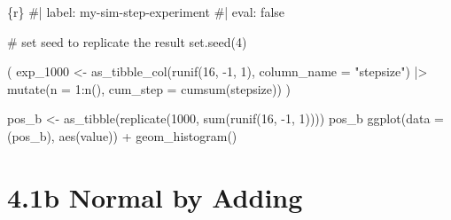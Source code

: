 \documentclass[
  letterpaper,
  DIV=11,
  numbers=noendperiod]{scrreprt}
\newenvironment{Shaded}{\begin{snugshade}}{\end{snugshade}}
\newcommand{\AttributeTok}[1]{\textcolor[rgb]{0.40,0.45,0.13}{#1}}
\newcommand{\CommentTok}[1]{\textcolor[rgb]{0.37,0.37,0.37}{#1}}
\newcommand{\DecValTok}[1]{\textcolor[rgb]{0.68,0.00,0.00}{#1}}
\newcommand{\FunctionTok}[1]{\textcolor[rgb]{0.28,0.35,0.67}{#1}}
\newcommand{\InformationTok}[1]{\textcolor[rgb]{0.37,0.37,0.37}{#1}}
\newcommand{\NormalTok}[1]{\textcolor[rgb]{0.00,0.23,0.31}{#1}}
\newcommand{\OtherTok}[1]{\textcolor[rgb]{0.00,0.23,0.31}{#1}}
\newcommand{\SpecialCharTok}[1]{\textcolor[rgb]{0.37,0.37,0.37}{#1}}
\newcommand{\StringTok}[1]{\textcolor[rgb]{0.13,0.47,0.30}{#1}}
\begin{document}
\begin{Shaded}
\begin{Highlighting}[]
\InformationTok{\textasciigrave{}\textasciigrave{}\textasciigrave{}\{r\}}
\CommentTok{\#| label: my{-}sim{-}step{-}experiment}
\CommentTok{\#| eval: false}

\CommentTok{\# set seed to replicate the result}
\FunctionTok{set.seed}\NormalTok{(}\DecValTok{4}\NormalTok{)}

\NormalTok{(}
\NormalTok{    exp\_1000 }\OtherTok{\textless{}{-}} \FunctionTok{as\_tibble\_col}\NormalTok{(}\FunctionTok{runif}\NormalTok{(}\DecValTok{16}\NormalTok{, }\SpecialCharTok{{-}}\DecValTok{1}\NormalTok{, }\DecValTok{1}\NormalTok{), }\AttributeTok{column\_name =} \StringTok{"stepsize"}\NormalTok{) }\SpecialCharTok{|\textgreater{}} 
        \FunctionTok{mutate}\NormalTok{(}\AttributeTok{n =} \DecValTok{1}\SpecialCharTok{:}\FunctionTok{n}\NormalTok{(),}
                \AttributeTok{cum\_step =} \FunctionTok{cumsum}\NormalTok{(stepsize))}
\NormalTok{)}

\NormalTok{pos\_b }\OtherTok{\textless{}{-}} \FunctionTok{as\_tibble}\NormalTok{(}\FunctionTok{replicate}\NormalTok{(}\DecValTok{1000}\NormalTok{, }\FunctionTok{sum}\NormalTok{(}\FunctionTok{runif}\NormalTok{(}\DecValTok{16}\NormalTok{, }\SpecialCharTok{{-}}\DecValTok{1}\NormalTok{, }\DecValTok{1}\NormalTok{))))}
\NormalTok{pos\_b}
\FunctionTok{ggplot}\NormalTok{(}\AttributeTok{data =}\NormalTok{ (pos\_b), }\FunctionTok{aes}\NormalTok{(value)) }\SpecialCharTok{+}
    \FunctionTok{geom\_histogram}\NormalTok{()}
\InformationTok{\textasciigrave{}\textasciigrave{}\textasciigrave{}}
\end{Highlighting}
\end{Shaded}

\hypertarget{b-normal-by-adding}{%
\section{4.1b Normal by Adding}\label{b-normal-by-adding}}
\end{document}

